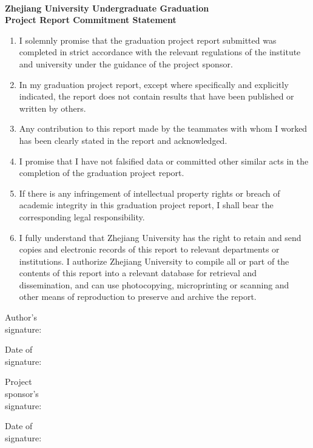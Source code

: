 ~~~\\
\vspace{1em}
\begin{center}
    \LARGE\bfseries Zhejiang University Undergraduate Graduation\\
    Project Report Commitment Statement
\end{center}
\vspace{3em}
\begin{enumerate}
    \item I solemnly promise that the graduation project report submitted was completed in strict accordance with the relevant regulations of the institute and university under the guidance of the project sponsor.
    \item In my graduation project report, except where specifically and explicitly indicated, the report does not contain results that have been published or written by others.
    \item Any contribution to this report made by the teammates with whom I worked has been clearly stated in the report and acknowledged.
    \item I promise that I have not falsified data or committed other similar acts in the completion of the graduation project report.
    \item If there is any infringement of intellectual property rights or breach of academic integrity in this graduation project report, I shall bear the corresponding legal responsibility.
    \item I fully understand that Zhejiang University has the right to retain and send copies and electronic records of this report to relevant departments or institutions. I authorize Zhejiang University to compile all or part of the contents of this report into a relevant database for retrieval and dissemination, and can use photocopying, microprinting or scanning and other means of reproduction to preserve and archive the report.
\end{enumerate}
\vfill
\begin{center}
    \hfill
    \begin{minipage}{0.46\linewidth}
        Author's\\
        signature:\\
        \vspace{2em}
    
        Date of\\
        signature:
    \end{minipage}
    \hfill
    \begin{minipage}{0.4\linewidth}
        Project\\
        sponsor's\\
        signature:\\
        \vspace{1em}
    
        Date of\\
        signature:
    \end{minipage}
    \vspace{2em}
\end{center}
